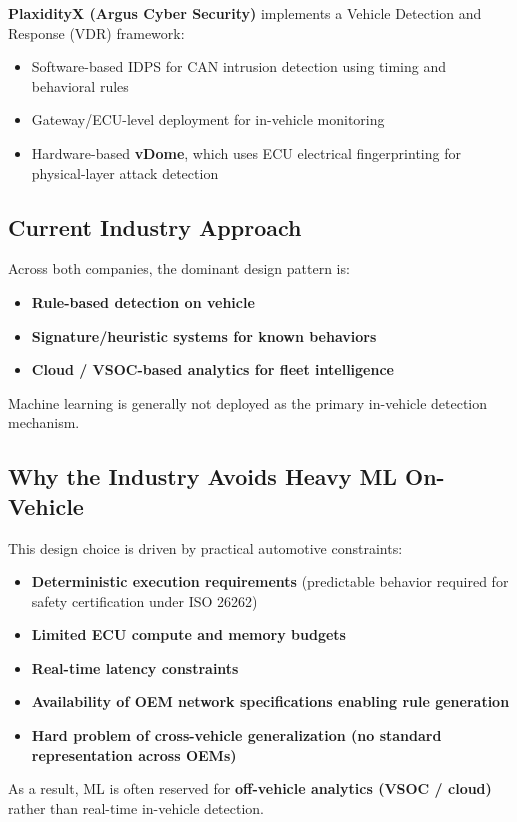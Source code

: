 \documentclass{article}
\begin{document}
\textbf{PlaxidityX (Argus Cyber Security)} implements a Vehicle Detection and Response (VDR) framework:
\begin{itemize}[noitemsep]
    \item Software-based IDPS for CAN intrusion detection using timing and behavioral rules
    \item Gateway/ECU-level deployment for in-vehicle monitoring
    \item Hardware-based \textbf{vDome}, which uses ECU electrical fingerprinting for physical-layer attack detection
\end{itemize}

\subsection{Current Industry Approach}
Across both companies, the dominant design pattern is:
\begin{itemize}[noitemsep]
    \item \textbf{Rule-based detection on vehicle}
    \item \textbf{Signature/heuristic systems for known behaviors}
    \item \textbf{Cloud / VSOC-based analytics for fleet intelligence}
\end{itemize}
Machine learning is generally not deployed as the primary in-vehicle detection mechanism.

\subsection{Why the Industry Avoids Heavy ML On-Vehicle}
This design choice is driven by practical automotive constraints:
\begin{itemize}[noitemsep]
    \item \textbf{Deterministic execution requirements} (predictable behavior required for safety certification under ISO 26262)
    \item \textbf{Limited ECU compute and memory budgets}
    \item \textbf{Real-time latency constraints}
    \item \textbf{Availability of OEM network specifications enabling rule generation}
    \item \textbf{Hard problem of cross-vehicle generalization (no standard representation across OEMs)}
\end{itemize}
As a result, ML is often reserved for \textbf{off-vehicle analytics (VSOC / cloud)} rather than real-time in-vehicle detection.
\end{document}
